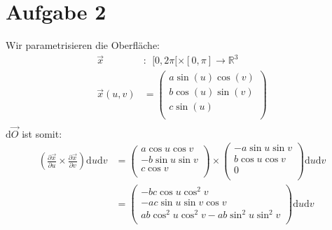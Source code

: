\documentclass[10pt,a4paper,parskip=half]{scrartcl}
\newcommand{\vecthree}[3]{\begin{pmatrix}#1\\#2\\#3\\\end {pmatrix}}
\begin{document}
\section*{Aufgabe 2}
Wir parametrisieren die Oberfläche:
\begin{align*}
\vec x&:~~ [0,2\pi[ \times [0,\pi] \to \mathbb{R}^3\\
\vec x(u,v) &= \vecthree{a\sin(u) \cos(v)}{b\cos(u)\sin(v)}{c \sin(u)} \\
\end{align*}
$\mathrm d \vec O$ ist somit:
\begin{align*}
\left(\frac{\partial \vec x}{\partial u} \times \frac{\partial \vec x}{\partial v}\right) \mathrm d u \mathrm d v &= \vecthree{a \cos u \cos v}{-b \sin u \sin v}{c \cos v} \times \vecthree{-a \sin u \sin v}{b \cos u \cos v}{0} \mathrm d u \mathrm d v\\
&= \vecthree{-bc \cos u \cos^2 v}{-ac \sin u \sin v \cos v}{ab \cos^2 u \cos^2 v - ab \sin^2 u \sin^2 v} \mathrm d u \mathrm d v\\
\end{align*}
\end{document}
